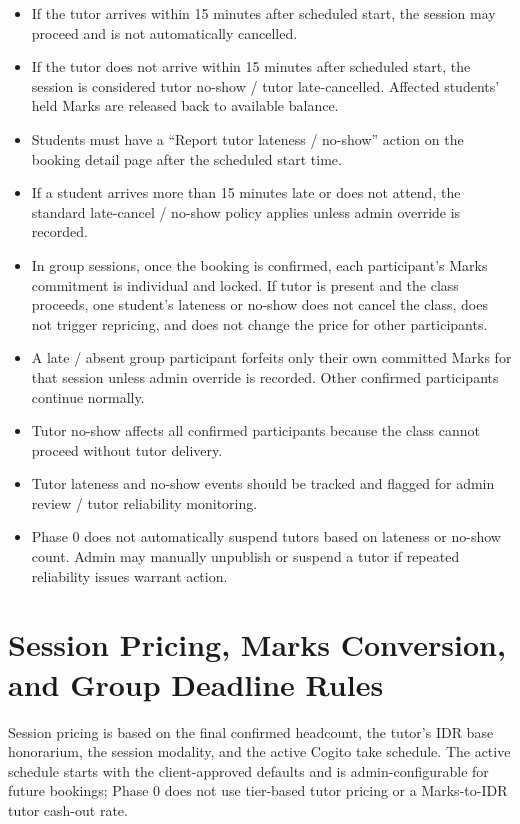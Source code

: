 \documentclass[11pt,a4paper]{article}
\begin{document}
\begin{itemize}
    \item If the tutor arrives within 15 minutes after scheduled start, the session may proceed and is not automatically cancelled.
    \item If the tutor does not arrive within 15 minutes after scheduled start, the session is considered tutor no-show / tutor late-cancelled. Affected students' held Marks are released back to available balance.
    \item Students must have a ``Report tutor lateness / no-show'' action on the booking detail page after the scheduled start time.
    \item If a student arrives more than 15 minutes late or does not attend, the standard late-cancel / no-show policy applies unless admin override is recorded.
    \item In group sessions, once the booking is confirmed, each participant's Marks commitment is individual and locked. If tutor is present and the class proceeds, one student's lateness or no-show does not cancel the class, does not trigger repricing, and does not change the price for other participants.
    \item A late / absent group participant forfeits only their own committed Marks for that session unless admin override is recorded. Other confirmed participants continue normally.
    \item Tutor no-show affects all confirmed participants because the class cannot proceed without tutor delivery.
    \item Tutor lateness and no-show events should be tracked and flagged for admin review / tutor reliability monitoring.
    \item Phase 0 does not automatically suspend tutors based on lateness or no-show count. Admin may manually unpublish or suspend a tutor if repeated reliability issues warrant action.
\end{itemize}

\section{Session Pricing, Marks Conversion, and Group Deadline Rules}

Session pricing is based on the final confirmed headcount, the tutor's IDR base honorarium, the session modality, and the active Cogito take schedule. The active schedule starts with the client-approved defaults and is admin-configurable for future bookings; Phase 0 does not use tier-based tutor pricing or a Marks-to-IDR tutor cash-out rate.
\end{document}
